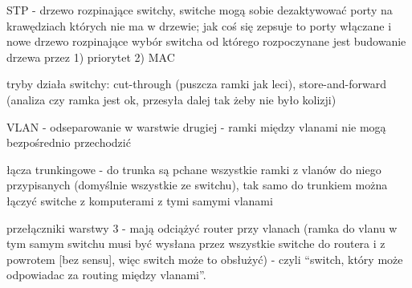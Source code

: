 \documentclass[../main.tex]{subfiles}
\begin{document}
    STP - drzewo rozpinające switchy, switche mogą sobie dezaktywować porty na krawędziach których nie ma w drzewie; jak coś się zepsuje to porty włączane i nowe drzewo rozpinające
    wybór switcha od którego rozpoczynane jest budowanie drzewa przez 1) priorytet 2) MAC

    tryby działa switchy: cut-through  (puszcza ramki jak leci), store-and-forward (analiza czy ramka jest ok, przesyła dalej tak żeby nie było kolizji)

    VLAN - odseparowanie w warstwie drugiej - ramki między vlanami nie mogą bezpośrednio przechodzić

    łącza trunkingowe - do trunka są pchane wszystkie ramki z vlanów do niego przypisanych (domyślnie wszystkie ze switchu), tak samo do trunkiem można łączyć switche z komputerami z tymi samymi vlanami

    przełączniki warstwy 3 - mają odciążyć router przy vlanach (ramka do vlanu w tym samym switchu musi być wysłana przez wszystkie switche do routera i z powrotem [bez sensu], więc switch może to obsłużyć) - czyli “switch, który może odpowiadac za routing między vlanami”.
\end{document}
